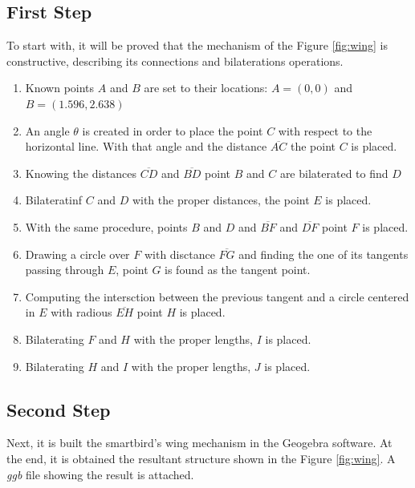 \documentclass[paper=a4, fontsize=11pt]{scrartcl} %
\begin{document}
\subsection*{First Step}
To start with, it will be proved that the mechanism of the Figure \ref{fig:wing} is constructive, describing its connections and bilaterations operations.
\begin{enumerate}
\item Known points $A$ and $B$ are set to their locations: $A=(0,0)$ and $B=(1.596,2.638)$
\item An angle $\theta$ is created in order to place the point $C$ with respect to the horizontal line. With that angle and the distance $\overline{AC}$ the point $C$ is placed.
\item Knowing the distances $\overline{CD}$ and $\overline{BD}$ point $B$ and $C$ are bilaterated to find $D$
\item Bilateratinf $C$ and $D$ with the proper distances, the point $E$ is placed.
\item With the same procedure, points $B$ and $D$ and $\overline{BF}$ and $\overline{DF}$ point $F$ is placed.
\item Drawing a circle over $F$ with disctance $\overline{FG}$ and finding the one of its tangents passing through $E$, point $G$ is found as the tangent point.
\item Computing the intersction between the previous tangent and a circle centered in $E$ with radious $\overline{EH}$ point $H$ is placed.
\item Bilaterating $F$ and $H$ with the proper lengths, $I$ is placed.
\item Bilaterating $H$ and $I$ with the proper lengths, $J$ is placed.
\end{enumerate}

\subsection*{Second Step}
Next, it is built the smartbird's wing mechanism in the Geogebra software. At the end, it is obtained the resultant structure shown in the Figure \ref{fig:wing}. A \emph{ggb} file showing the result is attached.
\end{document}
